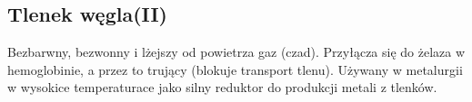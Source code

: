 \subsection{Tlenek węgla(II) }
Bezbarwny, bezwonny i lżejszy od powietrza gaz (czad).
Przyłącza się do żelaza w hemoglobinie, a przez to trujący (blokuje transport tlenu).
Używany w metalurgii w wysokice temperaturace jako silny reduktor do produkcji metali z tlenków.

